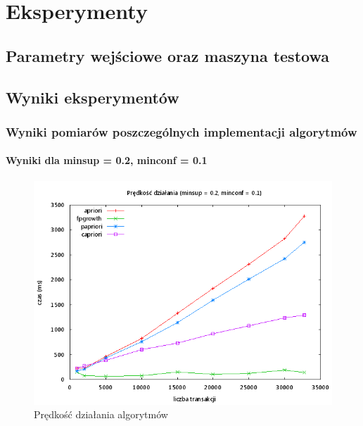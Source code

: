 \chapter{Eksperymenty\label{chap:eksperymenty}}

\section{Parametry wejściowe oraz maszyna testowa}

\section{Wyniki eksperymentów}

\subsection{Wyniki pomiarów poszczególnych implementacji algorytmów}

\subsubsection{Wyniki dla minsup = 0.2, minconf = 0.1}

\begin{figure}[ht]
\centering
\includegraphics[width=1.1\textwidth]{figures/06/02_01.png}
\caption{Prędkość działania algorytmów}
\end{figure}

